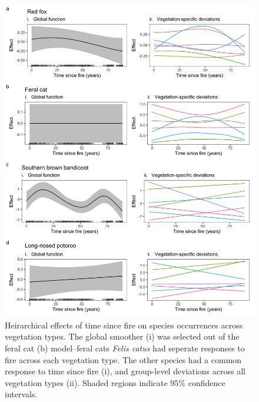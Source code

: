 \documentclass[11pt,a4paper,titlepage,twoside,openright]{style/unimelbthesis}
\begin{document}
\begin{mainmatter}
\begin{figure}
{\centering \includegraphics[width=1\linewidth]{figure/tsf_gs} 

}

\caption{Heirarchical effects of time since fire on species occurrences across vegetation types. The global smoother (i) was selected out of the feral cat (b) model--feral cats \textit{Felis catus} had seperate responses to fire across each vegetation type. The other species had a common response to time since fire (i), and group-level deviations across all vegetation types (ii). Shaded regions indicate 95\% confidence intervals.}\label{fig:occ-tsf-gs}
\end{figure}
\newpage

\(~\)

\(~\)

\(~\)
\begin{figure}


\end{figure}
\end{mainmatter}
\end{document}
